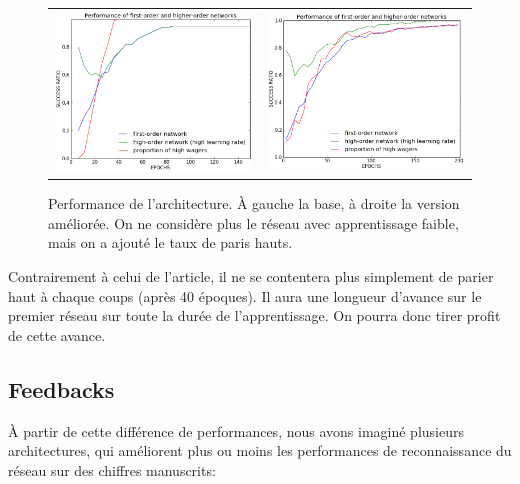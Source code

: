 \documentclass[a4paper,12pt, twoside]{article}
\begin{document}
\begin{figure}[H]
\begin{center}
\begin{tabular}{cc}
 \includegraphics[width=230px]{../cleeremans_2007/digital_reco/perf_wag.png} &
 \includegraphics[width=230px]{../cleeremans_2007/digital_reco/perf_boost.png}
\end{tabular}
\end{center}
 \caption{ Performance de l'architecture. À gauche la base, à droite la version améliorée.
 On ne considère plus le réseau avec apprentissage faible, mais on a ajouté le taux de paris hauts.}
\end{figure}

Contrairement à celui de l'article, il ne se contentera 
plus simplement de parier haut à chaque coups (après 40 époques). Il aura une longueur d'avance
sur le premier réseau sur toute la durée de l'apprentissage. On pourra donc tirer profit de
cette avance.

\subsection{Feedbacks}

À partir de cette différence de performances, nous avons imaginé plusieurs architectures, qui
améliorent plus ou moins les performances de reconnaissance du réseau sur des chiffres manuscrits:
\end{document}

